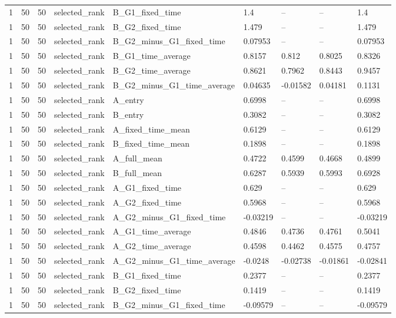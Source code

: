 \begin{longtable}{lllllllll}
1 & 50 & 50 & selected\_rank & B\_G1\_fixed\_time & 1.4 & -- & -- & 1.4 \\
1 & 50 & 50 & selected\_rank & B\_G2\_fixed\_time & 1.479 & -- & -- & 1.479 \\
1 & 50 & 50 & selected\_rank & B\_G2\_minus\_G1\_fixed\_time & 0.07953 & -- & -- & 0.07953 \\
1 & 50 & 50 & selected\_rank & B\_G1\_time\_average & 0.8157 & 0.812 & 0.8025 & 0.8326 \\
1 & 50 & 50 & selected\_rank & B\_G2\_time\_average & 0.8621 & 0.7962 & 0.8443 & 0.9457 \\
1 & 50 & 50 & selected\_rank & B\_G2\_minus\_G1\_time\_average & 0.04635 & -0.01582 & 0.04181 & 0.1131 \\
1 & 50 & 50 & selected\_rank & A\_entry & 0.6998 & -- & -- & 0.6998 \\
1 & 50 & 50 & selected\_rank & B\_entry & 0.3082 & -- & -- & 0.3082 \\
1 & 50 & 50 & selected\_rank & A\_fixed\_time\_mean & 0.6129 & -- & -- & 0.6129 \\
1 & 50 & 50 & selected\_rank & B\_fixed\_time\_mean & 0.1898 & -- & -- & 0.1898 \\
1 & 50 & 50 & selected\_rank & A\_full\_mean & 0.4722 & 0.4599 & 0.4668 & 0.4899 \\
1 & 50 & 50 & selected\_rank & B\_full\_mean & 0.6287 & 0.5939 & 0.5993 & 0.6928 \\
1 & 50 & 50 & selected\_rank & A\_G1\_fixed\_time & 0.629 & -- & -- & 0.629 \\
1 & 50 & 50 & selected\_rank & A\_G2\_fixed\_time & 0.5968 & -- & -- & 0.5968 \\
1 & 50 & 50 & selected\_rank & A\_G2\_minus\_G1\_fixed\_time & -0.03219 & -- & -- & -0.03219 \\
1 & 50 & 50 & selected\_rank & A\_G1\_time\_average & 0.4846 & 0.4736 & 0.4761 & 0.5041 \\
1 & 50 & 50 & selected\_rank & A\_G2\_time\_average & 0.4598 & 0.4462 & 0.4575 & 0.4757 \\
1 & 50 & 50 & selected\_rank & A\_G2\_minus\_G1\_time\_average & -0.0248 & -0.02738 & -0.01861 & -0.02841 \\
1 & 50 & 50 & selected\_rank & B\_G1\_fixed\_time & 0.2377 & -- & -- & 0.2377 \\
1 & 50 & 50 & selected\_rank & B\_G2\_fixed\_time & 0.1419 & -- & -- & 0.1419 \\
1 & 50 & 50 & selected\_rank & B\_G2\_minus\_G1\_fixed\_time & -0.09579 & -- & -- & -0.09579 \\

\end{longtable}

